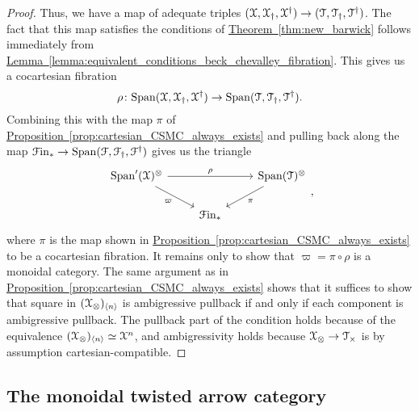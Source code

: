 \documentclass[main.tex]{subfiles}
\begin{document}
\begin{proof}
  Thus, we have a map of adequate triples $(\mathcal{X}, \mathcal{X}_{\dagger}, \mathcal{X}^{\dagger}) \to (\mathcal{T}, \mathcal{T}_{\dagger}, \mathcal{T}^{\dagger})$.
  The fact that this map satisfies the conditions of \hyperref[thm:new_barwick]{Theorem~\ref*{thm:new_barwick}} follows immediately from \hyperref[lemma:equivalent_conditions_beck_chevalley_fibration]{Lemma~\ref*{lemma:equivalent_conditions_beck_chevalley_fibration}}. This gives us a cocartesian fibration
  \begin{equation*}
    \rho\colon \mathrm{Span}(\mathcal{X}, \mathcal{X}_{\dagger}, \mathcal{X}^{\dagger}) \to \mathrm{Span}(\mathcal{T}, \mathcal{T}_{\dagger}, \mathcal{T}^{\dagger}).
  \end{equation*}
  Combining this with the map $\pi$ of \hyperref[prop:cartesian_CSMC_always_exists]{Proposition~\ref*{prop:cartesian_CSMC_always_exists}} and pulling back along the map $\mathcal{F}\mathrm{in}_{*} \to \mathrm{Span}(\mathcal{F}, \mathcal{F}_{\dagger}, \mathcal{F}^{\dagger})$ gives us the triangle
  \begin{equation*}
    \begin{tikzcd}
      \Span'(\category{X})^{\otimes}
      \arrow[rr, "\rho"]
      \arrow[dr, swap, "\varpi"]
      && \Span(\category{T})^{\otimes}
      \arrow[dl, "\pi"]
      \\
      & \Finp
    \end{tikzcd},
  \end{equation*}
  where $\pi$ is the map shown in \hyperref[prop:cartesian_CSMC_always_exists]{Proposition~\ref*{prop:cartesian_CSMC_always_exists}} to be a cocartesian fibration. It remains only to show that $\varpi = \pi \circ \rho$ is a monoidal category. The same argument as in \hyperref[prop:cartesian_CSMC_always_exists]{Proposition~\ref*{prop:cartesian_CSMC_always_exists}} shows that it suffices to show that square in $(\mathcal{X}_{\otimes})_{\langle n \rangle}$ is ambigressive pullback if and only if each component is ambigressive pullback. The pullback part of the condition holds because of the equivalence $(\mathcal{X}_{\otimes})_{\langle n \rangle} \simeq \mathcal{X}^{n}$, and ambigressivity holds because $\mathcal{X}_{\otimes} \to \mathcal{T}_{\times}$ is by assumption cartesian-compatible.
\end{proof}


\subsection{The monoidal twisted arrow category}
\label{ssc:the_monoidal_twisted_arrow_category}
\end{document}
